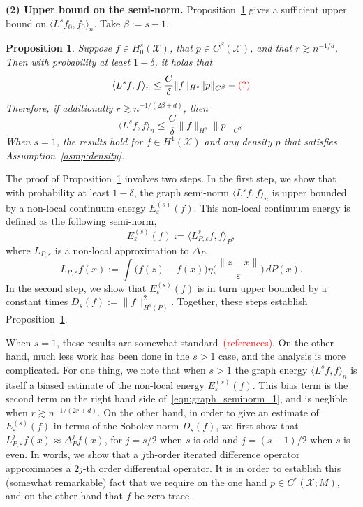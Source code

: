 \documentclass{article}
\newcommand{\1}{\mathbf{1}}
\newcommand{\mc}[1]{\mathcal{#1}}
\newcommand{\dotp}[2]{\langle #1, #2 \rangle}
\theoremstyle{alden}
\theoremstyle{aldenthm}
\newtheorem{proposition}{Proposition}
\theoremstyle{definition}
\theoremstyle{remark}
\begin{document}
\textbf{(2) Upper bound on the semi-norm. } Proposition~\ref{prop:graph_seminorm} gives a sufficient upper bound on $\dotp{L^s f_0}{f_0}_n$. Take $\beta := s - 1$. 
\begin{proposition}
	\label{prop:graph_seminorm} 
	Suppose $f \in H_0^s(\mc{X})$, that $p \in C^{\beta}(\mc{X})$, and that $r \gtrsim n^{-1/d}$. Then with probability at least $1 - \delta$, it holds that 
	\begin{equation}
	\label{eqn:graph_seminorm_1}
	\dotp{L^s f}{f}_n \leq \frac{C}{\delta} \|f\|_{H^s} \|p\|_{C^{\beta}} + \textcolor{red}{(?)}
	\end{equation}
	Therefore, if additionally $r \gtrsim n^{-1/(2\beta + d)}$, then 
	\begin{equation}
	\label{eqn:graph_seminorm_2}
	\dotp{L^s f}{f}_n \leq \frac{C}{\delta} \|f\|_{H^s} \|p\|_{C^{\beta}}
	\end{equation}
	When $s = 1$, the results hold for $f \in H^1(\mc{X})$ and any density $p$ that satisfies Assumption~\ref{asmp:density}.
\end{proposition}
The proof of Proposition~\ref{prop:graph_seminorm} involves two steps. In the first step, we show that with probability at least $1 - \delta$, the graph semi-norm $\dotp{L^s f}{f}_n$ is upper bounded by a non-local continuum energy $E_{\varepsilon}^{(s)}(f)$. This non-local continuum energy is defined as the following semi-norm,
\begin{equation*}
E_{\varepsilon}^{(s)}(f) := \dotp{L_{P,\varepsilon}^sf}{f}_{P},
\end{equation*}
where $L_{P,\varepsilon}$ is a non-local approximation to $\Delta_P$, 
\begin{equation*}
L_{P,\varepsilon}f(x) := \int \bigl(f(z) - f(x)\bigr) \eta\biggl(\frac{\|z - x\|}{\varepsilon}\biggr) \,dP(x).
\end{equation*}
In the second step, we show that $E_{\varepsilon}^{(s)}(f)$ is in turn upper bounded by a constant times $D_s(f) := \|f\|_{H^s(P)}^2$. Together, these steps establish Proposition~\ref{prop:graph_seminorm}.

When $s = 1$, these results are somewhat standard~\textcolor{red}{(references)}. On the other hand, much less work has been done in the $s > 1$ case, and the analysis is more complicated. For one thing, we note that when $s > 1$ the graph energy $\dotp{L^s f}{f}_n$ is itself a biased estimate of the non-local energy $E_{\varepsilon}^{(s)}(f)$. This bias term is the second term on the right hand side of~\eqref{eqn:graph_seminorm_1}, and is neglible when $r \gtrsim n^{-1/(2r + d)}$. On the other hand, in order to give an estimate of $E_{\varepsilon}^{(s)}(f)$ in terms of the Sobolev norm $D_s(f)$, we first show that $L_{P,\varepsilon}^jf(x) \approx \Delta_P^jf(x)$, for $j = s/2$ when $s$ is odd and $j = (s - 1)/2$ when $s$ is even. In words, we show that a $j$th-order iterated difference operator approximates a $2j$-th order differential operator.  It is in order to establish this (somewhat remarkable) fact that we require on the one hand $p \in C^{r}(\mc{X};M)$, and on the other hand that $f$ be zero-trace.
\end{document}
